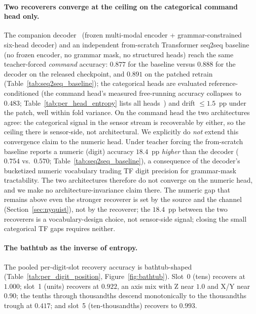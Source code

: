 \documentclass[entropy,article,submit,moreauthors,pdftex]{Definitions/mdpi}
\begin{document}
\paragraph{Two recoverers converge at the ceiling on the categorical command head only.} The companion decoder~\cite{paperA_decoder} (frozen multi-modal encoder + grammar-constrained six-head decoder) and an independent from-scratch Transformer seq2seq baseline (no frozen encoder, no grammar mask, no structured heads) reach the same teacher-forced \emph{command} accuracy: $0.877$ for the baseline versus $0.888$ for the decoder on the released checkpoint, and $0.891$ on the patched retrain (Table~\ref{tab:seq2seq_baseline}); the categorical heads are evaluated reference-conditioned (the command head's measured free-running accuracy collapses to $0.483$; Table~\ref{tab:per_head_entropy} lists all heads~\cite{paperA_decoder}) and drift $\le\!1.5$~pp under the patch, well within fold variance. On the command head the two architectures agree: the categorical signal in the sensor stream is recoverable by either, so the ceiling there is sensor-side, not architectural. We explicitly do \emph{not} extend this convergence claim to the numeric head. Under teacher forcing the from-scratch baseline reports a numeric (digit) accuracy $18.4$~pp \emph{higher} than the decoder ($0.754$ vs.\ $0.570$; Table~\ref{tab:seq2seq_baseline}), a consequence of the decoder's bucketized numeric vocabulary trading TF digit precision for grammar-mask tractability. The two architectures therefore do not converge on the numeric head, and we make no architecture-invariance claim there. The numeric gap that remains above even the stronger recoverer is set by the source and the channel (Section~\ref{sec:nyquist}), not by the recoverer; the $18.4$~pp between the two recoverers is a vocabulary-design choice, not sensor-side signal; closing the small categorical TF gaps requires neither.



\paragraph{The bathtub as the inverse of entropy.} The pooled per-digit-slot recovery accuracy is bathtub-shaped (Table~\ref{tab:per_digit_position}, Figure~\ref{fig:bathtub}). Slot~0 (tens) recovers at $1.000$; slot~1 (units) recovers at $0.922$, an axis mix with Z near $1.0$ and X/Y near $0.90$; the tenths through thousandths descend monotonically to the thousandths trough at $0.417$; and slot~5 (ten-thousandths) recovers to $0.993$.
\end{document}
